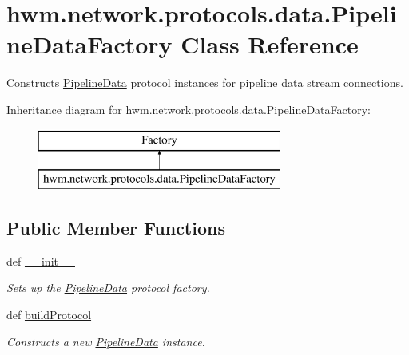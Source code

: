 \hypertarget{classhwm_1_1network_1_1protocols_1_1data_1_1_pipeline_data_factory}{\section{hwm.\-network.\-protocols.\-data.\-Pipeline\-Data\-Factory Class Reference}
\label{classhwm_1_1network_1_1protocols_1_1data_1_1_pipeline_data_factory}
}


Constructs \hyperlink{classhwm_1_1network_1_1protocols_1_1data_1_1_pipeline_data}{Pipeline\-Data} protocol instances for pipeline data stream connections.  


Inheritance diagram for hwm.\-network.\-protocols.\-data.\-Pipeline\-Data\-Factory\-:\begin{figure}[H]
\begin{center}
\leavevmode
\includegraphics[height=2.000000cm]{classhwm_1_1network_1_1protocols_1_1data_1_1_pipeline_data_factory}
\end{center}
\end{figure}
\subsection*{Public Member Functions}
\begin{DoxyCompactItemize}
\item 
def \hyperlink{classhwm_1_1network_1_1protocols_1_1data_1_1_pipeline_data_factory_a7ddbf296687f2671afc81b187dfd90a1}{\-\_\-\-\_\-init\-\_\-\-\_\-}
\begin{DoxyCompactList}\small\item\em Sets up the \hyperlink{classhwm_1_1network_1_1protocols_1_1data_1_1_pipeline_data}{Pipeline\-Data} protocol factory. \end{DoxyCompactList}\item 
def \hyperlink{classhwm_1_1network_1_1protocols_1_1data_1_1_pipeline_data_factory_a4c6a497cd088833a660feb31d4c8698e}{build\-Protocol}
\begin{DoxyCompactList}\small\item\em Constructs a new \hyperlink{classhwm_1_1network_1_1protocols_1_1data_1_1_pipeline_data}{Pipeline\-Data} instance. \end{DoxyCompactList}\end{DoxyCompactItemize}
